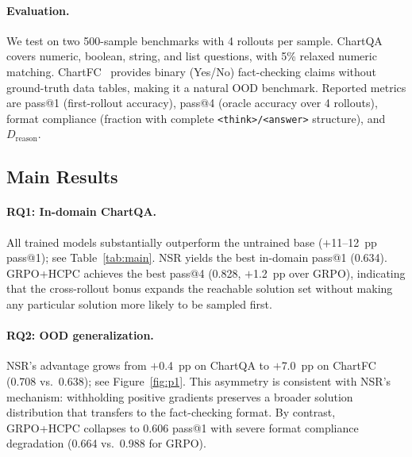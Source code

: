 \documentclass[11pt]{article}
\newcommand{\hcpc}{\textsc{HCPC}}
\newcommand{\grpo}{\textsc{GRPO}}
\newcommand{\nsr}{\textsc{NSR}}
\begin{document}
\paragraph{Evaluation.}
We test on two 500-sample benchmarks with 4 rollouts per sample.
ChartQA~\citep{masry2022chartqa} covers numeric, boolean, string, and list questions,
with 5\% relaxed numeric matching.
ChartFC~\citep{akhtar2023chartfc} provides binary (Yes/No) fact-checking claims
without ground-truth data tables, making it a natural OOD benchmark.
Reported metrics are pass@1 (first-rollout accuracy), pass@4 (oracle accuracy over
4 rollouts), format compliance (fraction with complete \texttt{<think>/<answer>}
structure), and $D_\text{reason}$.

\subsection{Main Results}

\paragraph{RQ1: In-domain ChartQA.}
All trained models substantially outperform the untrained base ($+$11--12~pp
pass@1); see Table~\ref{tab:main}.
\nsr{} yields the best in-domain pass@1 (0.634).
\grpo{}+\hcpc{} achieves the best pass@4 (0.828, $+$1.2~pp over \grpo), indicating
that the cross-rollout bonus expands the reachable solution set without making any
particular solution more likely to be sampled first.

\paragraph{RQ2: OOD generalization.}
\nsr{}'s advantage grows from $+$0.4~pp on ChartQA to $+$7.0~pp on ChartFC
(0.708 vs.\ 0.638); see Figure~\ref{fig:p1}.
This asymmetry is consistent with \nsr{}'s mechanism: withholding positive
gradients preserves a broader solution distribution that transfers to the
fact-checking format.
By contrast, \grpo{}+\hcpc{} collapses to 0.606 pass@1 with severe format
compliance degradation (0.664 vs.\ 0.988 for \grpo).
\end{document}
